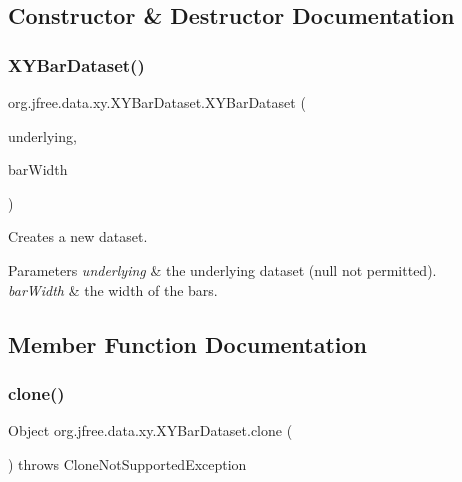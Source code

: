 \subsection{Constructor \& Destructor Documentation}
\mbox{\label{classorg_1_1jfree_1_1data_1_1xy_1_1_x_y_bar_dataset_a590860d8caab84c3e67f5c0e14b4131d}} 
\subsubsection{\texorpdfstring{X\+Y\+Bar\+Dataset()}{XYBarDataset()}}
{\footnotesize\ttfamily org.\+jfree.\+data.\+xy.\+X\+Y\+Bar\+Dataset.\+X\+Y\+Bar\+Dataset (\begin{DoxyParamCaption}\item[{\mbox{\hyperlink{interfaceorg_1_1jfree_1_1data_1_1xy_1_1_x_y_dataset}{X\+Y\+Dataset}}}]{underlying,  }\item[{double}]{bar\+Width }\end{DoxyParamCaption})}

Creates a new dataset.


\begin{DoxyParams}{Parameters}
{\em underlying} & the underlying dataset ({\ttfamily null} not permitted). \\
\hline
{\em bar\+Width} & the width of the bars. \\
\hline
\end{DoxyParams}


\subsection{Member Function Documentation}
\mbox{\label{classorg_1_1jfree_1_1data_1_1xy_1_1_x_y_bar_dataset_a4121f402c60d912cc2778814c0a74b3f}} 
\subsubsection{\texorpdfstring{clone()}{clone()}}
{\footnotesize\ttfamily Object org.\+jfree.\+data.\+xy.\+X\+Y\+Bar\+Dataset.\+clone (\begin{DoxyParamCaption}{ }\end{DoxyParamCaption}) throws Clone\+Not\+Supported\+Exception}

